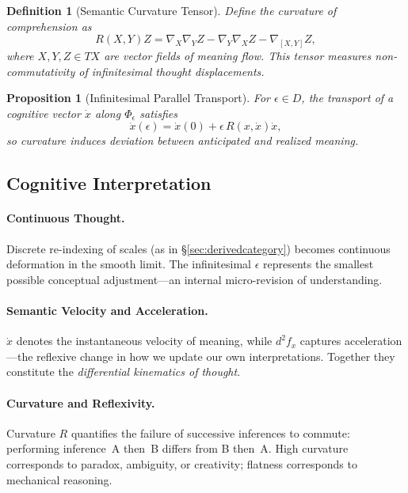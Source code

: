 \documentclass[12pt,a4paper,twoside,openright]{book}
\newtheorem{proposition}[theorem]{Proposition}
\newtheorem{definition}[theorem]{Definition}
\begin{document}
\begin{definition}[Semantic Curvature Tensor]
Define the curvature of comprehension as
\[
R(X,Y)Z
=
\nabla_X\nabla_Y Z-\nabla_Y\nabla_X Z-\nabla_{[X,Y]}Z,
\]
where $X,Y,Z\in T\!X$ are vector fields of meaning flow.
This tensor measures non-commutativity of infinitesimal thought displacements.
\end{definition}

\begin{proposition}[Infinitesimal Parallel Transport]
For $\epsilon\in D$, the transport of a cognitive vector $\dot{x}$ along $\Phi_\epsilon$ satisfies
\[
\dot{x}(\epsilon)=\dot{x}(0)
+\epsilon\,R(x,\dot{x})\dot{x},
\]
so curvature induces deviation between anticipated and realized meaning.
\end{proposition}

\subsection*{Cognitive Interpretation}

\paragraph{Continuous Thought.}
Discrete re-indexing of scales (as in §\ref{sec:derivedcategory})
becomes continuous deformation in the smooth limit.
The infinitesimal $\epsilon$ represents the smallest possible
conceptual adjustment—an internal micro-revision of understanding.

\paragraph{Semantic Velocity and Acceleration.}
$\dot{x}$ denotes the instantaneous velocity of meaning,
while $d^2f_x$ captures acceleration—the reflexive change in how
we update our own interpretations.
Together they constitute the \emph{differential kinematics of thought}.

\paragraph{Curvature and Reflexivity.}
Curvature $R$ quantifies the failure of successive inferences to commute:
performing inference~A then~B differs from B then~A.
High curvature corresponds to paradox, ambiguity, or creativity;
flatness corresponds to mechanical reasoning.
\end{document}
